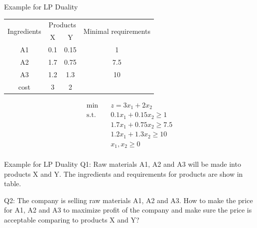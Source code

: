 \documentclass[12pt,notes,mathserif]{beamer}
\begin{document}
\begin{frame}{Example for LP Duality} 
	\begin{table}
	\begin{tabular}{cccc}
		\hline
		\multirow{2}{*}{Ingredients} & \multicolumn{2}{c}{Products} & \multirow{2}{*}{Minimal requirements}  \\ \cline{2-3}
			 & X   & Y    &     \\  \hline \hline
		A1   & 0.1 & 0.15 & 1   \\
		A2   & 1.7 & 0.75 & 7.5 \\
		A3   & 1.2 & 1.3  & 10  \\ \hline
		cost & 3   & 2    &     \\ \hline
	\end{tabular}
\end{table}

\begin{equation*}
	\begin{aligned}
		\min \quad & z=3x_1 +2x_2  \\ 
		\textrm{s.t.} \quad & 0.1x_1 + 0.15x_2 \ge 1 \\  
		& 1.7 x_1 + 0.75 x_2 \ge 7.5 \\  
		&	1.2x_1 + 1.3x_2 \ge 10  \\ 
		& x_1, x_2	 \ge 0  \\
	\end{aligned}
\end{equation*}

\end{frame}

\begin{frame}
	{Example for LP Duality}  
	Q1: Raw materials A1, A2 and A3 will be made into products X and Y. The ingredients and requirements for products are show in table.  
	
	Q2: The company is selling raw materials A1, A2 and A3. How to make the price for A1, A2 and A3 to  maximize profit of the company and make sure the price is acceptable comparing to products X and Y? 	

\end{frame}
\end{document}
